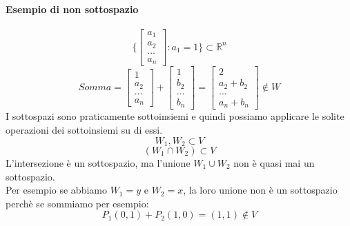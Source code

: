 \documentclass[12pt,a4paper]{article}
\begin{document}
\paragraph{Esempio di non sottospazio}
\[
\{\begin{bmatrix}
  a_1\\
  a_2\\
  \ldots\\
  a_n
\end{bmatrix}
: a_1 = 1\} \subset \mathbb{R}^n
\]
\[
Somma = \begin{bmatrix}
  1\\
  a_2\\
  \ldots\\
  a_n
\end{bmatrix} + \begin{bmatrix}
  1\\
  b_2\\
  \ldots\\
  b_n
\end{bmatrix} = \begin{bmatrix}
  2\\
  a_2 + b_2\\
  \ldots\\
  a_n + b_n
\end{bmatrix} \notin W
\]
I sottospazi sono praticamente sottoinsiemi e quindi possiamo applicare le solite operazioni dei sottoinsiemi su di essi.\\
\[
W_1,W_2 \subset V
\]
\[
(W_1 \cap W_2) \subset V 
\]
L'intersezione è un sottospazio, ma l'unione $W_1 \cup W_2$ non è quasi mai un sottospazio.\\
Per esempio se abbiamo $W_1 = y$ e $W_2 = x$, la loro unione non è un sottospazio perchè se sommiamo per esempio:
\[
P_1(0,1) + P_2(1,0) = (1,1) \notin V
\]
\end{document}
